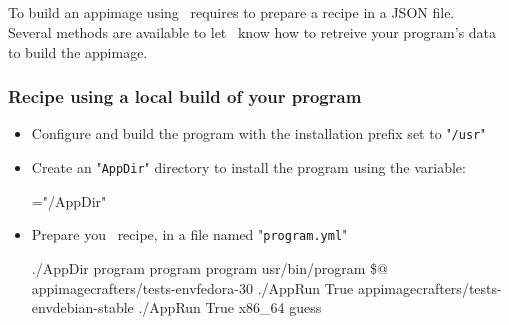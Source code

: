 \subsection{\abuild}

To build an appimage using \abuild\ requires to prepare a recipe in a JSON file. \\
Several methods are available to let \abuild\ know how to retreive your program's data to build the appimage. 

\subsubsection*{Recipe using a local build of your program}

\begin{itemize}
\item Configure and build the program with the installation prefix set to "\texttt{/usr}"
{\footnotesize{
\begin{scripti}
  
 
\end{scripti}
}}
\item Create an "\texttt{AppDir}" directory to install the program using the  variable: 
{\footnotesize{
\begin{scripti}
  
   ="/AppDir"
\end{scripti}
}}
\item Prepare you \abuild\ recipe, in a file named "\texttt{program.yml}" 
{\footnotesize{
\begin{scripti}
 
   ./AppDir
     program     
     program   
     program   
     
     usr/bin/program
     \$@
       appimagecrafters/tests-envfedora-30
       ./AppRun
       True
       appimagecrafters/tests-envdebian-stable
       ./AppRun
       True
   x86\_64
   guess
\end{scripti}
}}
\end{itemize}

